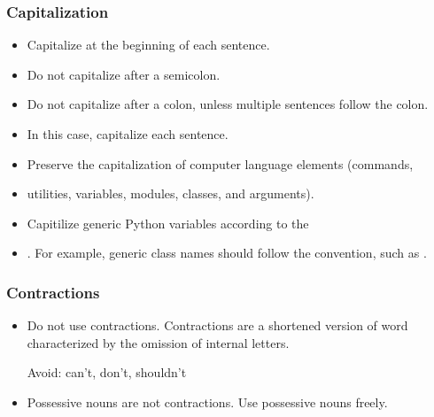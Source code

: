 \documentclass[letterpaper,10pt,english]{sphinxmanual}
\begin{document}
\subsubsection{Capitalization}
\label{\detokenize{development/style_guide:capitalization}}\begin{itemize}
\item {} 
Capitalize at the beginning of each sentence.

\item {} 
Do not capitalize after a semicolon.

\item {} 
Do not capitalize after a colon, unless multiple sentences follow the colon.

\item {} 
In this case, capitalize each sentence.

\item {} 
Preserve the capitalization of computer language elements (commands,

\item {} 
utilities, variables, modules, classes, and arguments).

\item {} 
Capitilize generic Python variables according to the

\item {} 
. For example,
generic class names should follow the  convention, such as
.

\end{itemize}


\subsubsection{Contractions}
\label{\detokenize{development/style_guide:contractions}}\begin{itemize}
\item {} 
Do not use contractions. Contractions are a shortened version of word
characterized by the omission of internal letters.

Avoid: can’t, don’t, shouldn’t

\item {} 
Possessive nouns are not contractions. Use possessive nouns freely.

\end{itemize}
\end{document}
